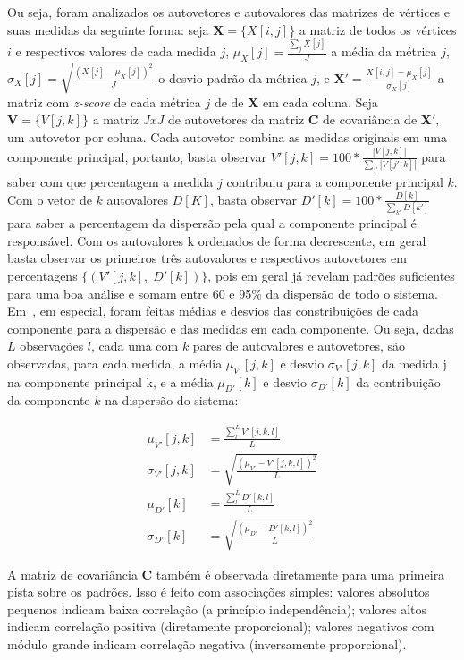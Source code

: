 \documentclass[a4paper,openright,12pt]{report} %
\begin{document}
Ou seja, foram analizados os autovetores e autovalores das matrizes
de vértices e suas medidas da seguinte forma: seja $\mathbf{X}=\{X[i,j]\}$
a matriz de todos os vértices $i$ e respectivos valores de cada medida $j$, 
$\mu_X [j]=\frac{\sum_j X[j]}{J}$ a média da métrica $j$, 
$\sigma_X [j]=\sqrt{\frac{(X[j]-\mu_X [j])^2}{J}}$ o desvio padrão da métrica $j$,
e $\mathbf{X'}={\frac{X[i,j]-\mu_X[j]}{\sigma_X[j]}}$ a matriz com \emph{z-score} de cada métrica $j$ de de $\mathbf{X}$ em cada coluna. Seja $\mathbf{V}=\{V[j,k]\}$ a matriz $JxJ$ de autovetores da matriz $\mathbf{C}$ de covariância
de $\mathbf{X'}$, um autovetor por coluna.
Cada autovetor combina as medidas originais em uma componente principal, portanto, basta observar 
$V'[j,k]=100*\frac{|V[j,k]|}{\sum_{j'} |V[j',k]|}$
para saber com que percentagem a medida $j$ contribuiu
para a componente principal $k$.
Com o vetor de $k$ autovalores $D[K]$,
basta observar $D'[k]=100*\frac{D[k]}{\sum_{k'}D[k']}$ para saber
a percentagem da dispersão pela qual a componente principal é responsável.
Com os autovalores k ordenados de forma decrescente, 
em geral basta observar os primeiros três autovalores e respectivos
autovetores em percentagens $\{(V'[j,k],\;D'[k])\}$, pois em geral
já revelam padrões suficientes para uma boa análise e somam entre 60 e 95\% da dispersão de todo o sistema.
Em~\cite{timeS}, em especial, foram feitas médias e desvios das constribuições de cada componente para a dispersão e das medidas em cada componente. Ou seja, dadas $L$ observações $l$, cada uma com $k$ pares de autovalores e autovetores, são observadas, para cada medida,
a média $\mu_{V'}[j,k]$ e desvio $\sigma_{V'}[j,k]$ 
da medida j na componente principal k,
e a média $\mu_{D'}[k]$ e desvio $\sigma_{D'}[k]$ da 
contribuição da componente $k$ na dispersão do sistema:

\begin{align}\label{eq:pca}
\mu_{V'}[j,k]   &=\frac{\sum_l^L V'[j,k,l]}{L}\nonumber\\
\sigma_{V'}[j,k]&=\sqrt{\frac{(\mu_{V'}-V'[j,k,l])^2}{L}}\\\nonumber
\mu_{D'}[k]&=\frac{\sum_l^L D'[k,l]}{L}\\\nonumber
\sigma_{D'}[k]&=\sqrt{\frac{(\mu_{D'}-D'[k,l])^2}{L}}
\end{align}

A matriz de covariância $\mathbf{C}$ também é observada diretamente para
uma primeira pista sobre os padrões. Isso é feito com associações simples: valores absolutos pequenos indicam baixa correlação (a princípio independência); valores altos indicam correlação positiva (diretamente proporcional);
valores negativos com módulo grande indicam correlação negativa (inversamente proporcional).
\end{document}
